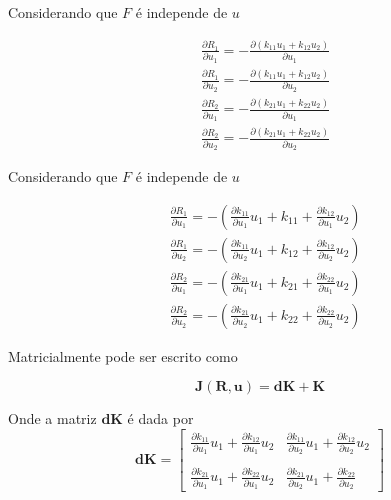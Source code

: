 \documentclass[12pt,a4paper]{article}
\begin{document}
Considerando que $F$ é independe de $u$

\begin{align}
&\frac{\partial R_1}{\partial u_1} = -\frac{\partial (k_{11} u_1 + k_{12} u_2)}{\partial u_1}\\ 
&\frac{\partial R_1}{\partial u_2} = -\frac{\partial (k_{11} u_1 + k_{12} u_2)}{\partial u_2}\\ 
&\frac{\partial R_2}{\partial u_1} = -\frac{\partial (k_{21} u_1 + k_{22} u_2)}{\partial u_1}\\  
&\frac{\partial R_2}{\partial u_2} = -\frac{\partial (k_{21} u_1 + k_{22} u_2)}{\partial u_2} 
\end{align}

Considerando que $F$ é independe de $u$

\begin{align}
&\frac{\partial R_1}{\partial u_1} = -\left(\frac{\partial k_{11}}{\partial u_1} u_1 + k_{11} + \frac{\partial k_{12}}{\partial u_1} u_2\right)\\ 
&\frac{\partial R_1}{\partial u_2} = -\left(\frac{\partial k_{11}}{\partial u_2} u_1 + k_{12} + \frac{\partial k_{12}}{\partial u_2} u_2\right)\\ 
&\frac{\partial R_2}{\partial u_1} = -\left(\frac{\partial k_{21}}{\partial u_1} u_1 + k_{21} + \frac{\partial k_{22}}{\partial u_1} u_2\right)\\ 
&\frac{\partial R_2}{\partial u_2} = -\left(\frac{\partial k_{21}}{\partial u_2} u_1 + k_{22} + \frac{\partial k_{22}}{\partial u_2} u_2\right) 
\end{align}

Matricialmente pode ser escrito como


\begin{equation}
\mathbf{J}(\mathbf{R}, \mathbf{u}) = \mathbf{dK} + \mathbf{K}
\end{equation}

\noindent
Onde a matriz $\mathbf{dK}$ é dada por
\begin{equation}
\mathbf{dK} =
\begin{bmatrix} 
\frac{\partial k_{11}}{\partial u_1} u_1 + \frac{\partial k_{12}}{\partial u_1} u_2& \frac{\partial k_{11}}{\partial u_2} u_1 + \frac{\partial k_{12}}{\partial u_2} u_2\\ 
\\
\frac{\partial k_{21}}{\partial u_1} u_1 + \frac{\partial k_{22}}{\partial u_1} u_2& \frac{\partial k_{21}}{\partial u_2} u_1 + \frac{\partial k_{22}}{\partial u_2}
\end{bmatrix}
\end{equation}
\end{document}
